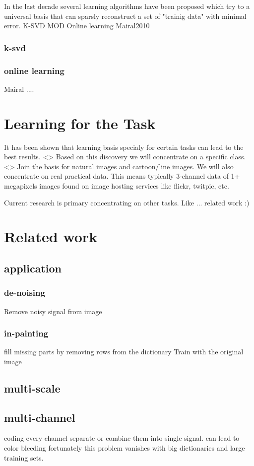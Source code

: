 In the last decade several learning algorithms have been proposed which try to a universal basis that 
can sparsly reconstruct a set of "trainig data" with minimal error. 
K-SVD
MOD
Online learning
Mairal2010

\subsubsection{k-svd}
\subsubsection{online learning}
Mairal .... \cite{Mairal2010}

\section{Learning for the Task}
It has been shown that learning basis specialy for certain tasks can lead to the best results\cite{}.  <>
Based on this discovery we will concentrate on a specific class. <> Join the basis for natural images and cartoon/line images.
We will also concentrate on real practical data. This means typically 3-channel data of 1+ megapixels images found on image hosting services like flickr, twitpic, etc.

Current research is primary concentrating on other tasks. 
Like ... related work :)

\section{Related work}
\subsection{application}
\subsubsection{de-noising}
Remove noisy signal from image
\subsubsection{in-painting}
fill missing parts by removing rows from the dictionary
Train with the original image

\subsection{multi-scale}
\cite{saprio}
\subsection{multi-channel}
coding every channel separate or combine them
into single signal. can lead to color bleeding \cite{mairal08sparse}
fortunately this problem vanishes with big dictionaries and large training sets. \cite{mairal08sparse}

